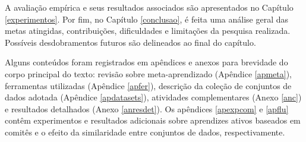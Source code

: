 A avaliação empírica e seus resultados associados são apresentados
no Capítulo \ref{experimentos}.
Por fim, no Capítulo \ref{conclusao}, é feita uma análise geral das metas atingidas, contribuições, dificuldades e limitações da pesquisa realizada.
Possíveis desdobramentos futuros são delineados ao final do capítulo.

Alguns conteúdos foram registrados em apêndices e anexos para brevidade do corpo principal do texto: revisão sobre meta-aprendizado (Apêndice \ref{apmeta}), ferramentas utilizadas (Apêndice \ref{apfer}), descrição da coleção de conjuntos de dados adotada (Apêndice \ref{apdatasets}), atividades complementares  (Anexo \ref{anc}) e resultados detalhados (Anexo \ref{anresdet}).
Os apêndices \ref{apexpcom} e \ref{apflu} contêm experimentos e resultados adicionais sobre aprendizes ativos baseados em comitês e o efeito da similaridade entre conjuntos de dados, respectivamente.